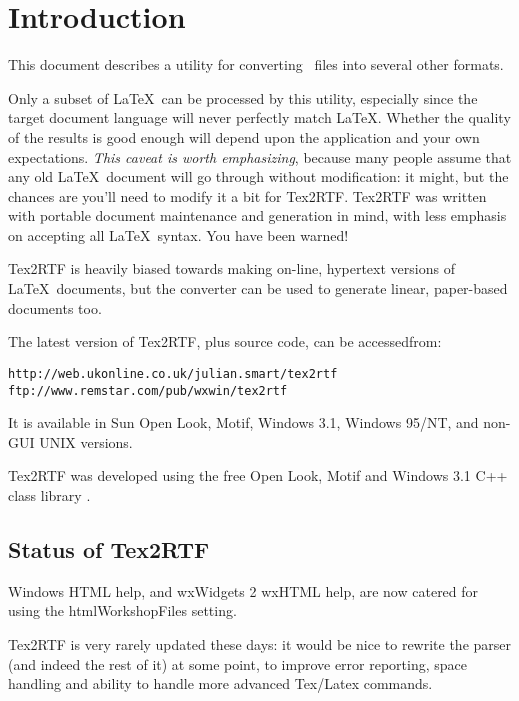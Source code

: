 \chapter{Introduction}%
%
%
\setfooter{\thepage}{}{}{}{}{\thepage}%

This document describes a utility for converting \ files into
several other formats.

Only a subset of \LaTeX\ can be processed by this utility, especially
since the target document language will never perfectly match \LaTeX.
Whether the quality of the results is good enough will depend upon the
application and your own expectations. {\it This caveat is worth emphasizing}, because
many people assume that any old \LaTeX\ document will go through without modification: it might,
but the chances are you'll need to modify it a bit for Tex2RTF. Tex2RTF was written with
portable document maintenance and generation in mind, with less emphasis on accepting all \LaTeX\ syntax.
You have been warned!

Tex2RTF is heavily biased towards making on-line, hypertext versions of
\rtfsp\LaTeX\ documents, but the  converter can be used to generate linear,
paper-based documents too.

The latest version of Tex2RTF, plus source code, can be accessedfrom:

\begin{verbatim}
http://web.ukonline.co.uk/julian.smart/tex2rtf
ftp://www.remstar.com/pub/wxwin/tex2rtf
\end{verbatim}

It is available in Sun Open Look, Motif, Windows 3.1, Windows 95/NT, and
non-GUI UNIX versions.

Tex2RTF was developed using the free Open Look, Motif and Windows 3.1
C++ class library .

\section{Status of Tex2RTF}%

Windows HTML help, and wxWidgets 2 wxHTML help, are now catered for using
the htmlWorkshopFiles setting.

Tex2RTF is very rarely updated these days: it would be nice to
rewrite the parser (and indeed the rest of it) at some point,
to improve error reporting, space handling and ability to
handle more advanced Tex/Latex commands.

